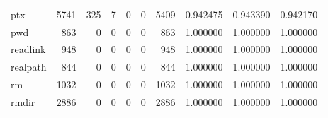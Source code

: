 \begin{longtable}{lrrrrrrrrr}
ptx       &                                               5741 &                                                325 &                                                  7 &                                                  0 &                                                  0 &                                               5409 &                                           0.942475 &                               0.943390 &                             0.942170 \\
pwd       &                                                863 &                                                  0 &                                                  0 &                                                  0 &                                                  0 &                                                863 &                                           1.000000 &                               1.000000 &                             1.000000 \\
readlink  &                                                948 &                                                  0 &                                                  0 &                                                  0 &                                                  0 &                                                948 &                                           1.000000 &                               1.000000 &                             1.000000 \\
realpath  &                                                844 &                                                  0 &                                                  0 &                                                  0 &                                                  0 &                                                844 &                                           1.000000 &                               1.000000 &                             1.000000 \\
rm        &                                               1032 &                                                  0 &                                                  0 &                                                  0 &                                                  0 &                                               1032 &                                           1.000000 &                               1.000000 &                             1.000000 \\
rmdir     &                                               2886 &                                                  0 &                                                  0 &                                                  0 &                                                  0 &                                               2886 &                                           1.000000 &                               1.000000 &                             1.000000 \\

\end{longtable}
